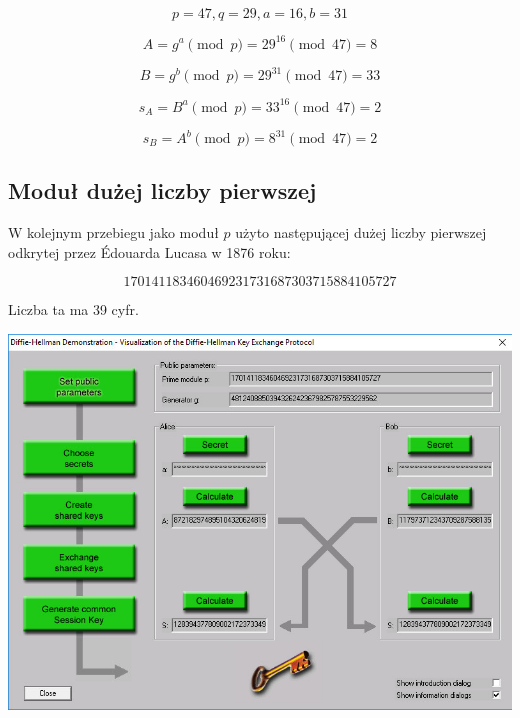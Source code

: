 \documentclass[12pt]{article}
\begin{document}
\begin{equation}
	p = 47, q = 29, a = 16, b = 31 
\end{equation}

\begin{equation}
	A = g^a \pmod{p} = 29^{16} \pmod{47} = 8
\end{equation}

\begin{equation}
	B = g^b \pmod{p} = 29^{31} \pmod{47} = 33
\end{equation}

\begin{equation}
	s_A = B^{a} \pmod{p} = 33^{16} \pmod{47} = 2
\end{equation}

\begin{equation}
	s_B = A^{b} \pmod{p} = 8^{31} \pmod{47} = 2
\end{equation}

\newpage

\subsection{Moduł dużej liczby pierwszej}

W kolejnym przebiegu jako moduł $p$ użyto następującej dużej liczby pierwszej odkrytej przez Édouarda Lucasa w 1876 roku:

\begin{equation}
	170141183460469231731687303715884105727
\end{equation}

Liczba ta ma 39 cyfr.

\begin{center}
	\includegraphics[scale=0.4]{4-cryptool-2}
\end{center}
\end{document}
